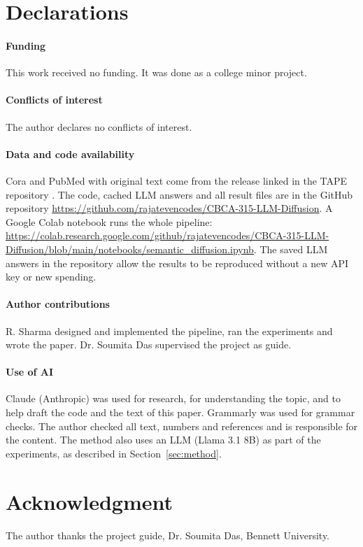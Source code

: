\documentclass[journal]{IEEEtran}
\begin{document}
\section*{Declarations}
\paragraph{Funding}
This work received no funding. It was done as a college minor project.

\paragraph{Conflicts of interest}
The author declares no conflicts of interest.

\paragraph{Data and code availability}
Cora and PubMed with original text come from the release linked in the TAPE repository \cite{he2024}. The code, cached LLM answers and all result files are in the GitHub repository \url{https://github.com/rajatevencodes/CBCA-315-LLM-Diffusion}. A Google Colab notebook runs the whole pipeline: \url{https://colab.research.google.com/github/rajatevencodes/CBCA-315-LLM-Diffusion/blob/main/notebooks/semantic_diffusion.ipynb}. The saved LLM answers in the repository allow the results to be reproduced without a new API key or new spending.

\paragraph{Author contributions}
R. Sharma designed and implemented the pipeline, ran the experiments and wrote the paper. Dr. Soumita Das supervised the project as guide.

\paragraph{Use of AI}
Claude (Anthropic) was used for research, for understanding the topic, and to help draft the code and the text of this paper. Grammarly was used for grammar checks. The author checked all text, numbers and references and is responsible for the content. The method also uses an LLM (Llama 3.1 8B) as part of the experiments, as described in Section~\ref{sec:method}.

\section*{Acknowledgment}
The author thanks the project guide, Dr. Soumita Das, Bennett University.



\end{document}
